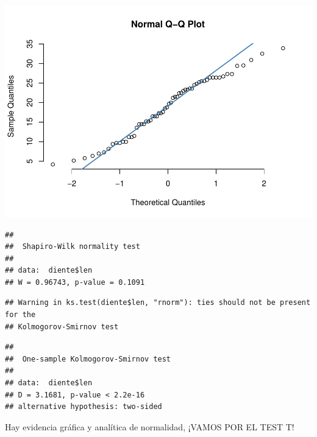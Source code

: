 \documentclass[
]{book}
\newenvironment{Shaded}{\begin{snugshade}}{\end{snugshade}}
\newcommand{\DocumentationTok}[1]{\textcolor[rgb]{0.56,0.35,0.01}{\textbf{\textit{#1}}}}
\newcommand{\FunctionTok}[1]{\textcolor[rgb]{0.00,0.00,0.00}{#1}}
\newcommand{\NormalTok}[1]{#1}
\newcommand{\SpecialCharTok}[1]{\textcolor[rgb]{0.00,0.00,0.00}{#1}}
\newcommand{\StringTok}[1]{\textcolor[rgb]{0.31,0.60,0.02}{#1}}
\begin{document}
\includegraphics{Esatadistica_en_R_files/figure-latex/unnamed-chunk-187-4.pdf}

\begin{Shaded}
\end{Shaded}

\begin{verbatim}
## 
##  Shapiro-Wilk normality test
## 
## data:  diente$len
## W = 0.96743, p-value = 0.1091
\end{verbatim}

\begin{Shaded}
\end{Shaded}

\begin{verbatim}
## Warning in ks.test(diente$len, "rnorm"): ties should not be present for the
## Kolmogorov-Smirnov test
\end{verbatim}

\begin{verbatim}
## 
##  One-sample Kolmogorov-Smirnov test
## 
## data:  diente$len
## D = 3.1681, p-value < 2.2e-16
## alternative hypothesis: two-sided
\end{verbatim}

Hay evidencia gráfica y analítica de normalidad, ¡VAMOS POR EL TEST T!
\end{document}
